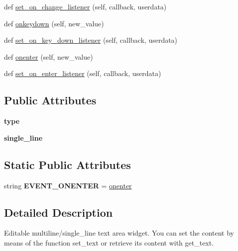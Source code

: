 \begin{DoxyCompactItemize}
def \hyperlink{classremi_1_1gui_1_1TextInput_ae56b8863f62b143cd27cc450bfa1076a}{set\+\_\+on\+\_\+change\+\_\+listener} (self, callback, userdata)
\item 
def \hyperlink{classremi_1_1gui_1_1TextInput_ae7f4eb4993fb8ce37215426dbde3534a}{onkeydown} (self, new\+\_\+value)
\item 
def \hyperlink{classremi_1_1gui_1_1TextInput_aaa9b351150b3c23b85592355be5a8203}{set\+\_\+on\+\_\+key\+\_\+down\+\_\+listener} (self, callback, userdata)
\item 
def \hyperlink{classremi_1_1gui_1_1TextInput_a5da6d7161c97ea9e47fd8b1a49e3cd0f}{onenter} (self, new\+\_\+value)
\item 
def \hyperlink{classremi_1_1gui_1_1TextInput_ab76a0a03c9f12a4e0ae4112ec7f799ff}{set\+\_\+on\+\_\+enter\+\_\+listener} (self, callback, userdata)
\end{DoxyCompactItemize}
\subsection*{Public Attributes}
\begin{DoxyCompactItemize}
\item 
{\bfseries type}\hypertarget{classremi_1_1gui_1_1TextInput_aadf11d56c4b381b76fc778c3ee70060e}{}\label{classremi_1_1gui_1_1TextInput_aadf11d56c4b381b76fc778c3ee70060e}

\item 
{\bfseries single\+\_\+line}\hypertarget{classremi_1_1gui_1_1TextInput_a30706ac0676d725154f58b1514bfdace}{}\label{classremi_1_1gui_1_1TextInput_a30706ac0676d725154f58b1514bfdace}

\end{DoxyCompactItemize}
\subsection*{Static Public Attributes}
\begin{DoxyCompactItemize}
\item 
string {\bfseries E\+V\+E\+N\+T\+\_\+\+O\+N\+E\+N\+T\+ER} = \textquotesingle{}\hyperlink{classremi_1_1gui_1_1TextInput_a5da6d7161c97ea9e47fd8b1a49e3cd0f}{onenter}\textquotesingle{}\hypertarget{classremi_1_1gui_1_1TextInput_a3d12fc7b72ad4d85be316b241247f46e}{}\label{classremi_1_1gui_1_1TextInput_a3d12fc7b72ad4d85be316b241247f46e}

\end{DoxyCompactItemize}


\subsection{Detailed Description}
\begin{DoxyVerb}Editable multiline/single_line text area widget. You can set the content by means of the function set_text or
 retrieve its content with get_text.
\end{DoxyVerb}
 

